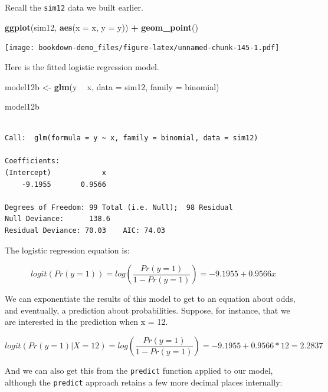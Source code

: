 \documentclass[]{book}
\newenvironment{Shaded}{\begin{snugshade}}{\end{snugshade}}
\newcommand{\KeywordTok}[1]{\textcolor[rgb]{0.13,0.29,0.53}{\textbf{#1}}}
\newcommand{\DataTypeTok}[1]{\textcolor[rgb]{0.13,0.29,0.53}{#1}}
\newcommand{\StringTok}[1]{\textcolor[rgb]{0.31,0.60,0.02}{#1}}
\newcommand{\OperatorTok}[1]{\textcolor[rgb]{0.81,0.36,0.00}{\textbf{#1}}}
\newcommand{\NormalTok}[1]{#1}
\theoremstyle{definition}
\theoremstyle{definition}
\theoremstyle{definition}
\theoremstyle{remark}
\begin{document}
Recall the \texttt{sim12} data we built earlier.

\begin{Shaded}
\begin{Highlighting}[]
\KeywordTok{ggplot}\NormalTok{(sim12, }\KeywordTok{aes}\NormalTok{(}\DataTypeTok{x =}\NormalTok{ x, }\DataTypeTok{y =}\NormalTok{ y)) }\OperatorTok{+}\StringTok{ }\KeywordTok{geom_point}\NormalTok{()}
\end{Highlighting}
\end{Shaded}

\texttt{[image: bookdown-demo\_files/figure-latex/unnamed-chunk-145-1.pdf]}

Here is the fitted logistic regression model.

\begin{Shaded}
\begin{Highlighting}[]
\NormalTok{model12b <-}\StringTok{ }\KeywordTok{glm}\NormalTok{(y }\OperatorTok{~}\StringTok{ }\NormalTok{x, }\DataTypeTok{data =}\NormalTok{ sim12, }\DataTypeTok{family =}\NormalTok{ binomial)}

\NormalTok{model12b}
\end{Highlighting}
\end{Shaded}

\begin{verbatim}

Call:  glm(formula = y ~ x, family = binomial, data = sim12)

Coefficients:
(Intercept)            x  
    -9.1955       0.9566  

Degrees of Freedom: 99 Total (i.e. Null);  98 Residual
Null Deviance:      138.6 
Residual Deviance: 70.03    AIC: 74.03
\end{verbatim}

The logistic regression equation is:

\[
logit(Pr(y = 1)) = log\left( \frac{Pr(y = 1)}{1 - Pr(y = 1)} \right) = -9.1955 + 0.9566 x
\]

We can exponentiate the results of this model to get to an equation
about odds, and eventually, a prediction about probabilities. Suppose,
for instance, that we are interested in the prediction when x = 12.

\[
logit(Pr(y = 1) | X = 12) = log\left( \frac{Pr(y = 1)}{1 - Pr(y = 1)} \right) = -9.1955 + 0.9566 * 12 = 2.2837
\]

And we can also get this from the \texttt{predict} function applied to
our model, although the \texttt{predict} approach retains a few more
decimal places internally:
\end{document}

